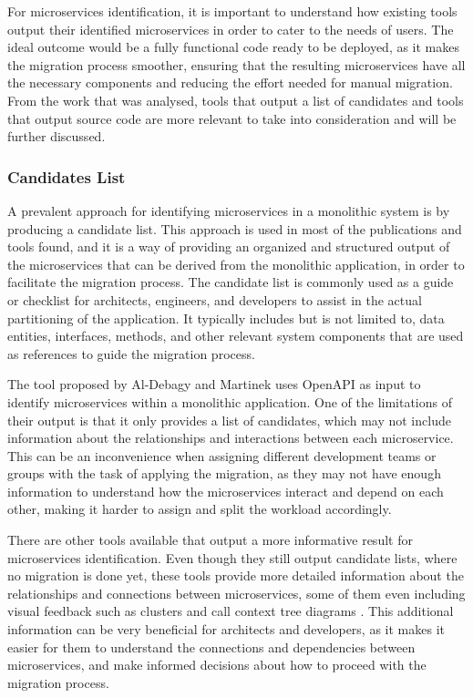 For microservices identification, it is important to understand how existing
tools output their identified microservices in order to cater to the needs of
users. The ideal outcome would be a fully functional code ready to be deployed,
as it makes the migration process smoother, ensuring that the resulting
microservices have all the necessary components and reducing the effort needed
for manual migration. From the work that was analysed, tools that output a list
of candidates and tools that output source code are more relevant to take into
consideration and will be further discussed.

\subsubsection*{Candidates List}

A prevalent approach for identifying microservices in a monolithic system is by
producing a candidate list. This approach is used in most of the publications
and tools found, and it is a way of providing an organized and structured
output of the microservices that can be derived from the monolithic
application, in order to facilitate the migration process. The candidate list
is commonly used as a guide or checklist for architects, engineers, and
developers to assist in the actual partitioning of the application. It
typically includes but is not limited to, data entities, interfaces, methods,
and other relevant system components that are used as references to guide the
migration process.

The tool proposed by Al-Debagy and Martinek  uses OpenAPI as
input to identify microservices within a monolithic application. One of the
limitations of their output is that it only provides a list of candidates,
which may not include information about the relationships and interactions
between each microservice. This can be an inconvenience when assigning
different development teams or groups with the task of applying the migration,
as they may not have enough information to understand how the microservices
interact and depend on each other, making it harder to assign and split the
workload accordingly.

There are other tools available that output a more informative result for
microservices identification. Even though they still output candidate lists,
where no migration is done yet, these tools provide more detailed information
about the relationships and connections between microservices, some of them
even including visual feedback such as clusters and call context tree diagrams
. This additional information can be very beneficial
for architects and developers, as it makes it easier for them to understand the
connections and dependencies between microservices, and make informed decisions
about how to proceed with the migration process.

